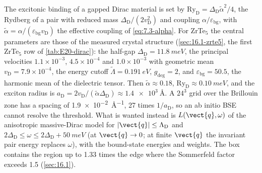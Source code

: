 The excitonic binding of a gapped Dirac material is set by $\mathrm{Ry}_{\mathrm{D}} = \Delta_{\mathrm{D}}\tilde\alpha^2/4$, the Rydberg of a pair with reduced mass $\Delta_{\mathrm{D}}/(2v_{\mathrm{D}}^2)$ and coupling $\alpha/\varepsilon_{\mathrm{bg}}$, with $\tilde\alpha = \alpha/(\varepsilon_{\mathrm{bg}}v_{\mathrm{D}})$ the effective coupling of \cref{eq:7.3-alpha}. For ZrTe$_5$ the central parameters are those of the measured crystal structure (\cref{sec:16.1-zrte5}, the first ZrTe$_5$ row of \cref{tab:E20-dirac}): the half-gap $\Delta_{\mathrm{D}} = \SI{11.8}{meV}$, the principal velocities $1.1\times10^{-3}$, $4.5\times10^{-4}$ and $1.0\times10^{-3}$ with geometric mean $v_{\mathrm{D}} = 7.9\times10^{-4}$, the energy cutoff $\tilde\Lambda = \SI{0.191}{eV}$, $g_{\mathrm{deg}} = 2$, and $\varepsilon_{\mathrm{bg}} = 50.5$, the harmonic mean of the dielectric tensor. Then $\tilde\alpha \approx 0.18$, $\mathrm{Ry}_{\mathrm{D}} \approx \SI{0.10}{meV}$, and the exciton radius is $a_{\mathrm{D}} = 2v_{\mathrm{D}}/(\tilde\alpha\Delta_{\mathrm{D}}) \approx \SI{1.4e3}{\angstrom}$. A $24^3$ grid over the Brillouin zone has a spacing of \SI{1.9e-2}{\angstrom^{-1}}, 27 times $1/a_{\mathrm{D}}$, so an ab initio BSE cannot resolve the threshold. What is wanted instead is $L(\vect{q},\omega)$ of the anisotropic massive-Dirac model for $|\vect{q}| \le \Lambda_{\mathrm{D}}$ and $2\Delta_{\mathrm{D}} \le \omega \le 2\Delta_{\mathrm{D}} + \SI{50}{meV}$ (at $\vect{q} \to 0$; at finite $\vect{q}$ the invariant pair energy replaces $\omega$), with the bound-state energies and weights. The box contains the region up to 1.33 times the edge where the Sommerfeld factor exceeds 1.5 (\cref{sec:16.1}).

